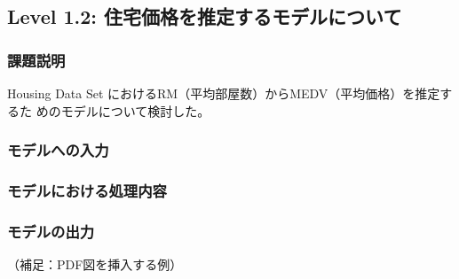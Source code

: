 \subsection{Level 1.2: 住宅価格を推定するモデルについて}
\subsubsection{課題説明}
Housing Data Set\cite{housingdata}
におけるRM（平均部屋数）からMEDV（平均価格）を推定するた
めのモデルについて検討した。

\subsubsection{モデルへの入力}
\subsubsection{モデルにおける処理内容}
\subsubsection{モデルの出力}


（補足：PDF図を挿入する例）


